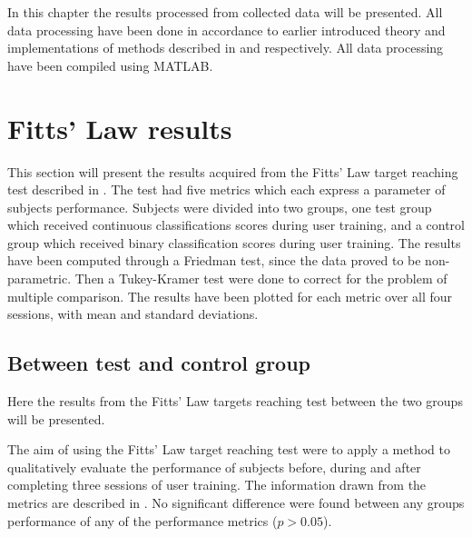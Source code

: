 
In this chapter the results processed from collected data will be presented. All data processing have been done in accordance to earlier introduced theory and implementations of methods described in  and  respectively. All data processing have been compiled using MATLAB.


\section{Fitts' Law results} \label{sec:R:fitts}
This section will present the results acquired from the Fitts' Law target reaching test described in . The test had five metrics which each express a parameter of subjects performance. Subjects were divided into two groups, one test group which received continuous classifications scores during user training, and a control group which received binary classification scores during user training. The results have been computed through a Friedman test, since the data proved to be non-parametric. Then a Tukey-Kramer test were done to correct for the problem of multiple comparison. The results have been plotted for each metric over all four sessions, with mean and standard deviations.
 

\subsection{Between test and control group}
Here the results from the Fitts' Law targets reaching test between the two groups will be presented.

%

The aim of using the Fitts' Law target reaching test were to apply a method to qualitatively evaluate the performance of subjects before, during and after completing three sessions of user training. The information drawn from the metrics are described in . No significant difference were found between any groups performance of any of the performance metrics ($p > 0.05$).  %

